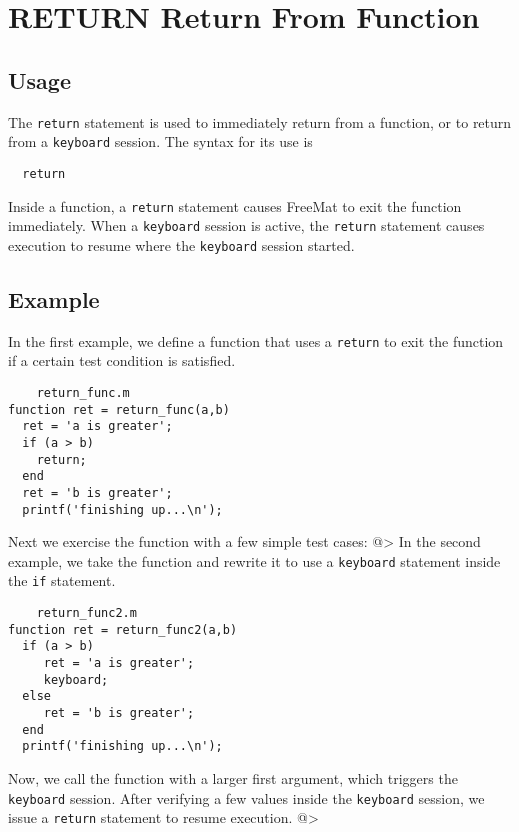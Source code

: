 \section{RETURN Return From Function}

\subsection{Usage}

The \verb|return| statement is used to immediately return from
a function, or to return from a \verb|keyboard| session.  The 
syntax for its use is
\begin{verbatim}
  return
\end{verbatim}
Inside a function, a \verb|return| statement causes FreeMat
to exit the function immediately.  When a \verb|keyboard| session
is active, the \verb|return| statement causes execution to
resume where the \verb|keyboard| session started.
\subsection{Example}

In the first example, we define a function that uses a
\verb|return| to exit the function if a certain test condition 
is satisfied.
\begin{verbatim}
    return_func.m
function ret = return_func(a,b)
  ret = 'a is greater';
  if (a > b)
    return;
  end
  ret = 'b is greater';
  printf('finishing up...\n');
\end{verbatim}
Next we exercise the function with a few simple test
cases:
@>
In the second example, we take the function and rewrite
it to use a \verb|keyboard| statement inside the \verb|if| statement.
\begin{verbatim}
    return_func2.m
function ret = return_func2(a,b)
  if (a > b)
     ret = 'a is greater';
     keyboard;
  else
     ret = 'b is greater';
  end
  printf('finishing up...\n');
\end{verbatim}
Now, we call the function with a larger first argument, which
triggers the \verb|keyboard| session.  After verifying a few
values inside the \verb|keyboard| session, we issue a \verb|return|
statement to resume execution.
@>
